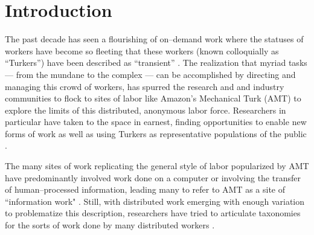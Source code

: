 \documentclass[trackingWork]{subfiles}
\begin{document}
\newcommand{\note}[1]{\onlyinsubfile{\textit{#1}}}

\section{Introduction}
The past decade has seen a flourishing of on--demand work
where the statuses of workers have become so fleeting that 
these workers
(known colloquially as ``Turkers'')
have been described as ``transient''
\cite{kargerIterativeLearning,mitraComparingStrategies,latozaCrowdDev}.
The realization
that myriad tasks
--- from the mundane to the complex ---
can be accomplished
by directing and managing this crowd of workers,
has spurred the research and and industry communities to flock to sites of labor
like Amazon's Mechanical Turk (AMT)
to explore the limits of this distributed, anonymous labor force.
Researchers in particular have taken to the space in earnest,
finding opportunities to enable new forms of work
as well as using Turkers
as representative populations of the public
\cite{bernsteinSoylent,redballoon,paolacci2010running}.

The many sites of work replicating
the general style of labor popularized by AMT
have predominantly involved work done on a computer
or involving the transfer of human--processed information,
leading many to refer to AMT as a site of ``information work"
\cite{turkopticon,professionalCrowdworkEthics,IraniFromCriticalDesign,OlsonMakeDistanceWorkWork}.
Still, with distributed work emerging with enough variation to problematize this description,
researchers have tried
to articulate taxonomies for the sorts of work done by many distributed workers
\cite{yuenSurvey,geiger2011managing,quinnbedersonTaxonomy}.
\end{document}
